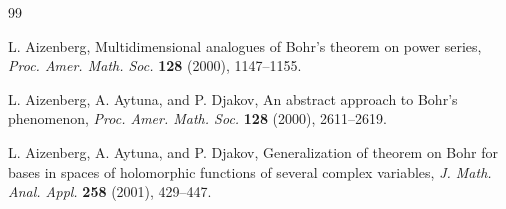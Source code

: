 \documentclass[a4paper,12pt]{amsart}
\theoremstyle{definition}
\begin{document}
\begin{thebibliography}{99}
	
	
	
	
	
	
	
	
	
	
	
	
	 {\sc L. Aizenberg}, Multidimensional analogues of Bohr's theorem on power series, \textit{Proc. Amer. Math. Soc.} {\bf 128} (2000), 1147--1155.
	
	 {\sc L. Aizenberg, A. Aytuna}, and {\sc P. Djakov}, An abstract approach to Bohr's phenomenon, {\it Proc. Amer. Math. Soc.} {\bf 128} (2000), 2611--2619.
	
	
	 {\sc L. Aizenberg, A. Aytuna},  and {\sc P. Djakov}, Generalization of theorem on Bohr for bases in spaces of holomorphic functions of several complex variables, 
	{\it J. Math. Anal. Appl.} {\bf  258} (2001), 429--447.
	

\end{thebibliography}
\end{document}
